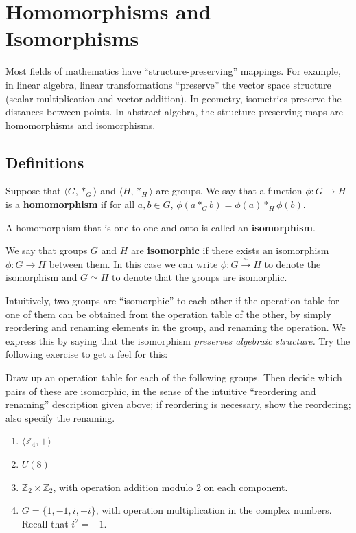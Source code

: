\chapter{Homomorphisms and Isomorphisms}
Most fields of mathematics have ``structure-preserving'' mappings. For example, in linear algebra, linear transformations ``preserve'' the vector space structure (scalar multiplication and vector addition). In geometry, isometries preserve the distances between points. In abstract algebra, the structure-preserving maps are homomorphisms and isomorphisms.

\section{Definitions}

\begin{definition}
Suppose that
\(\langle G, *_{G} \rangle \)
and \(\langle H, *_{H} \rangle \) are groups. We say that a function
\(\phi : G \longrightarrow H\) is a \textbf{homomorphism} if for all \(a, b \in G\), \(\phi(a *_{G} b) = \phi(a) *_{H} \phi(b) \).

A homomorphism that is one-to-one and onto is called an \textbf{isomorphism}.
\begin{annotation}
\end{annotation}
\end{definition}

We say that groups \(G\) and \(H\) are \textbf{isomorphic} if there exists an isomorphism \(\phi : G \longrightarrow H\) between them. In this case we can write \(\phi : G \stackrel{\sim}{\longrightarrow} H\) to denote the isomorphism and \(G \simeq H\) to denote that the groups are isomorphic.

Intuitively, two groups are ``isomorphic'' to each other if the operation table for one of them can be obtained from the operation table of the other, by simply reordering and renaming elements in the group, and renaming the operation. We express this by saying that the isomorphism \emph{preserves algebraic structure.} Try the following exercise to get a feel for this:

\begin{problem}
Draw up an operation table for each of the following groups. Then decide which pairs of these are isomorphic, in the sense of the intuitive ``reordering and renaming'' description given above; if reordering is necessary, show the reordering; also specify the renaming.
\begin{enumerate}
  \item \( \langle \mathbb{Z}_4, + \rangle  \)
  \item \( U(8) \)
  \item \( \mathbb{Z}_2 \times \mathbb{Z}_2 \), with operation addition modulo 2 on each component.
  \item \( G = \{1, -1, i, -i \} \), with operation multiplication in the complex numbers. Recall that \(i^2 = -1\).
\end{enumerate}
\end{problem}

